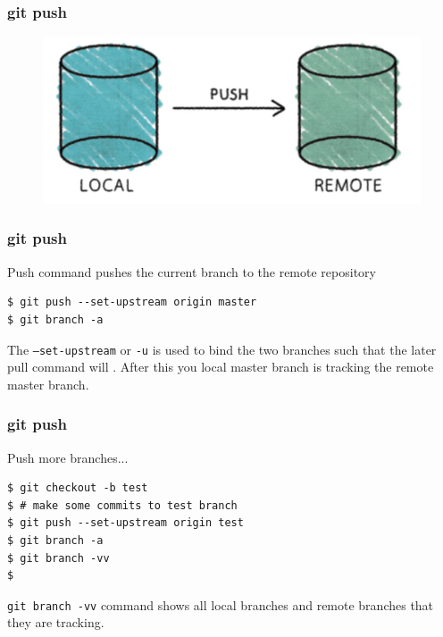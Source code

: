 \documentclass{beamer}
\begin{document}
\begin{frame}[fragile]
\frametitle{git push}
\begin{figure}

  \includegraphics[scale=0.3]{figures/f6.png}
\end{figure}
\end{frame}


\begin{frame}[fragile]
\frametitle{git push}

Push command pushes the current branch to the remote repository

\begin{lstlisting}
$ git push --set-upstream origin master 
$ git branch -a
\end{lstlisting}

The \texttt{---set-upstream} or \texttt{-u} is used to bind the two
branches such that the later pull command will . After this you local master
branch is tracking the remote master branch.

\end{frame}


\begin{frame}[fragile]
\frametitle{git push}

Push more branches...

\begin{lstlisting}
$ git checkout -b test
$ # make some commits to test branch
$ git push --set-upstream origin test 
$ git branch -a
$ git branch -vv
$ 
\end{lstlisting}

\texttt{git branch -vv} command shows all local branches and remote
branches that they are tracking.

\end{frame}



\end{document}
